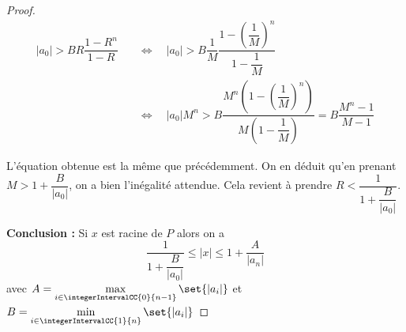 \begin{proof}
\[
\begin{aligned}
|a_0| > B R \dfrac{1 - R^{n}}{1 - R}
&\quad\Longleftrightarrow\quad
|a_0| >B \dfrac{1}{M} \dfrac{1-\left(\dfrac{1}{M}\right)^n}{1-\dfrac{1}{M}}\\
&\quad\Longleftrightarrow\quad
|a_0|M^n >B \dfrac{M^n\left(1-\left(\dfrac{1}{M}\right)^n\right)}{M\left(1-\dfrac{1}{M}\right)} = B \dfrac{M^n-1}{M-1}
\end{aligned}
\]

L'équation obtenue est la même que précédemment. On en déduit qu'en prenant $M > 1 + \dfrac{B}{|a_0|}$, on a bien l'inégalité attendue. Cela revient à prendre $R < \dfrac{1}{1 + \dfrac{B}{|a_0|}}$. 
\vspace{1.5\baselineskip}

\textbf{Conclusion :}
Si $x$ est racine de $P$ alors on a 
\[
 \dfrac{1}{1+\dfrac{B}{|a_0|}} \le |x| \le 1 + \dfrac{A}{|a_n|} 
\]
avec $A = \max\limits_{i\in \integerIntervalCC{0}{n-1}}\set{|a_i|}$ et $B = \min\limits_{i\in \integerIntervalCC{1}{n}}\set{|a_i|}$
\end{proof}